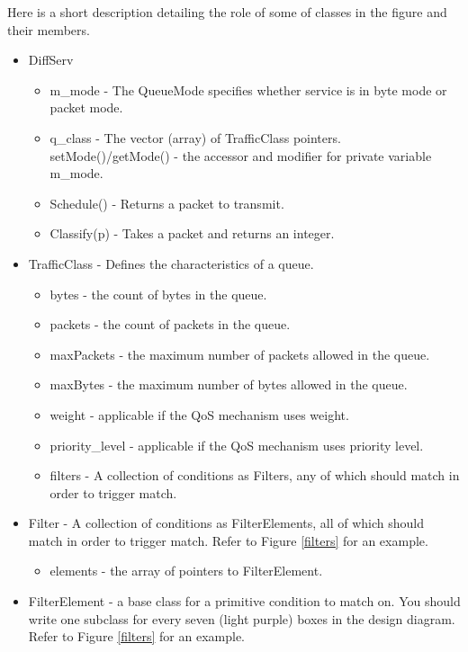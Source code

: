 \documentclass[10pt]{article}
\begin{document}
Here is a short description detailing the role of some of classes in the figure and their members.
\begin{itemize}
    \item DiffServ
    \begin{itemize}
        \item m_mode - The QueueMode specifies whether service is in byte mode or packet mode.
        \item q_class - The vector (array) of TrafficClass pointers.
setMode()/getMode() - the accessor and modifier for private variable m_mode.
        \item Schedule() - Returns a packet to transmit.
        \item Classify(p) - Takes a packet and returns an integer. 
    \end{itemize}
    \item TrafficClass - Defines the characteristics of a queue.
    \begin{itemize}
        \item bytes - the count of bytes in the queue.
        \item packets - the count of packets in the queue.
        \item maxPackets - the maximum number of packets allowed in the queue.
        \item maxBytes - the maximum number of bytes allowed in the queue.
        \item weight - applicable if the QoS mechanism uses weight.
        \item priority_level - applicable if the QoS mechanism uses priority level.
        \item filters - A collection of conditions as Filters, any of which should match in order to trigger match.
    \end{itemize}
    \item Filter - A collection of conditions as FilterElements, all of which should match in order to trigger match. Refer to Figure \ref{filters} for an example.
    \begin{itemize}
        \item elements - the array of pointers to FilterElement.
    \end{itemize}
    \item FilterElement - a base class for a primitive condition to match on. You should write one subclass for every seven (light purple) boxes in the design diagram. Refer to Figure \ref{filters} for an example.
\end{itemize}
\end{document}

